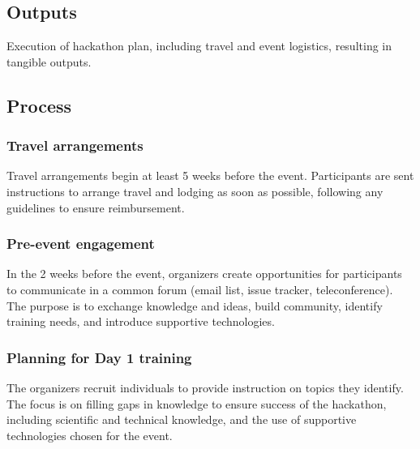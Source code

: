 \documentclass[letterpaper,11pt]{texMemo}
\begin{document}
\subsection{Outputs}
Execution of hackathon plan, including travel and event logistics, resulting in tangible outputs.  
\subsection{Process}
\subsubsection*{Travel arrangements} Travel arrangements begin at least 5 weeks before the event. Participants are sent instructions to arrange travel and lodging as soon as possible, following any guidelines to ensure reimbursement. 
\subsubsection*{Pre-event engagement} In the 2 weeks before the event, organizers create opportunities for participants to communicate in a common forum (email list, issue tracker, teleconference). The purpose is to exchange knowledge and ideas, build community, identify training needs, and introduce supportive technologies. 
\subsubsection*{Planning for Day 1 training} The organizers recruit individuals to provide instruction on topics they identify. The focus is on filling gaps in knowledge to ensure success of the hackathon, including scientific and technical knowledge, and the use of supportive technologies chosen for the event. 
\end{document}
